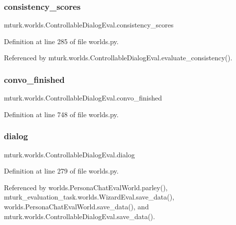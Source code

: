 \subsubsection{\texorpdfstring{consistency\+\_\+scores}{consistency\_scores}}
{\footnotesize\ttfamily mturk.\+worlds.\+Controllable\+Dialog\+Eval.\+consistency\+\_\+scores}



Definition at line 285 of file worlds.\+py.



Referenced by mturk.\+worlds.\+Controllable\+Dialog\+Eval.\+evaluate\+\_\+consistency().

\mbox{\label{classmturk_1_1worlds_1_1ControllableDialogEval_ac7241d7190341c8c85298c13190a556f}} 
\subsubsection{\texorpdfstring{convo\+\_\+finished}{convo\_finished}}
{\footnotesize\ttfamily mturk.\+worlds.\+Controllable\+Dialog\+Eval.\+convo\+\_\+finished}



Definition at line 748 of file worlds.\+py.

\mbox{\label{classmturk_1_1worlds_1_1ControllableDialogEval_a6db846b4fe4568a4cccfea506c2b326a}} 
\subsubsection{\texorpdfstring{dialog}{dialog}}
{\footnotesize\ttfamily mturk.\+worlds.\+Controllable\+Dialog\+Eval.\+dialog}



Definition at line 279 of file worlds.\+py.



Referenced by worlds.\+Persona\+Chat\+Eval\+World.\+parley(), mturk\+\_\+evaluation\+\_\+task.\+worlds.\+Wizard\+Eval.\+save\+\_\+data(), worlds.\+Persona\+Chat\+Eval\+World.\+save\+\_\+data(), and mturk.\+worlds.\+Controllable\+Dialog\+Eval.\+save\+\_\+data().

